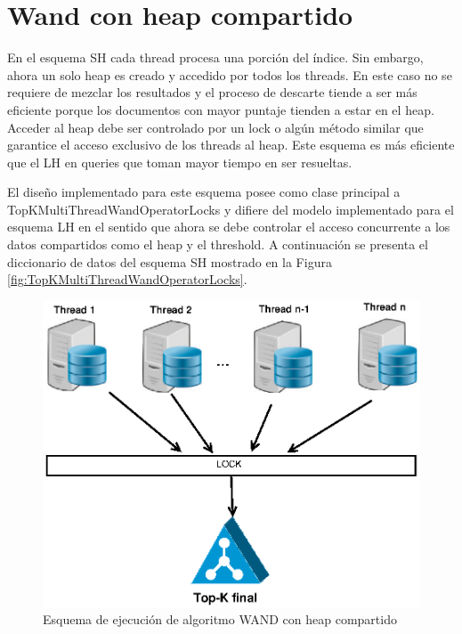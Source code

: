 \section{Wand con heap compartido}
\label{scheduling:whc}
En el esquema SH cada thread procesa una porción del índice. Sin embargo, ahora un solo heap es creado y accedido por todos los threads. En este caso no se requiere de mezclar los resultados y el proceso de descarte tiende a ser más eficiente porque los documentos con mayor puntaje tienden a estar en el heap. Acceder al heap debe ser controlado por un lock o algún método similar que garantice el acceso exclusivo de los threads al heap. Este esquema es más eficiente que el LH en queries que toman mayor tiempo en ser resueltas.

El diseño implementado para este esquema posee como clase principal a TopKMultiThreadWandOperatorLocks y difiere del modelo implementado para el esquema LH en el sentido que ahora se debe controlar el acceso concurrente a los datos compartidos como el heap y el threshold. A continuación se presenta el diccionario de datos del esquema SH mostrado en la Figura \ref{fig:TopKMultiThreadWandOperatorLocks}.

\begin{figure}[!ht]
\centering
\includegraphics[scale=.75]{images/wand_heaps_compartido.eps}
\caption{Esquema de ejecución de algoritmo WAND con heap compartido}
\label{fig:wand-heap-compartido}
\end{figure}

